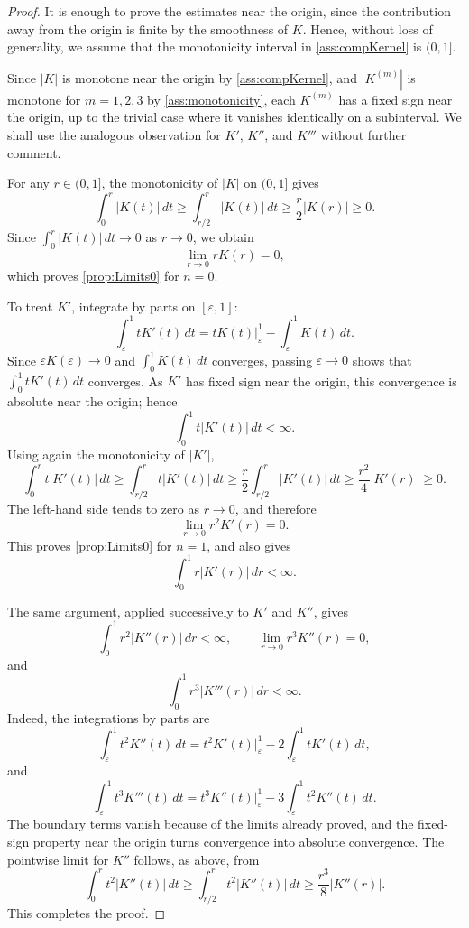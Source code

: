 \documentclass[a4paper]{amsart}
\theoremstyle{definition}
\begin{document}
\begin{proof}
It is enough to prove the estimates near the origin, since the contribution away from
the origin is finite by the smoothness of \(K\). Hence, without loss of generality, we
assume that the monotonicity interval in \ref{ass:compKernel} is \((0,1]\).

Since \(|K|\) is monotone near the origin by \ref{ass:compKernel}, and
\(|K^{(m)}|\) is monotone for \(m=1,2,3\) by \ref{ass:monotonicity}, each \(K^{(m)}\)
has a fixed sign near the origin, up to the trivial case where it vanishes identically
on a subinterval. We shall use the analogous
observation for \(K'\), \(K''\), and \(K'''\) without further comment.

For any \(r\in(0,1]\), the monotonicity of \(|K|\) on \((0,1]\) gives
\[
    \int_0^r |K(t)|\,dt
    \ge
    \int_{r/2}^r |K(t)|\,dt
    \ge
    \frac r2 |K(r)|
    \ge 0 .
\]
Since \(\int_0^r |K(t)|\,dt\to0\) as \(r\to0\), we obtain
\[
    \lim_{r\to0} rK(r)=0,
\]
which proves \ref{prop:Limits0} for \(n=0\).

To treat \(K'\), integrate by parts on \([\varepsilon,1]\):
\[
    \int_\varepsilon^1 tK'(t)\,dt
    =
    tK(t)\Big|_\varepsilon^1
    -
    \int_\varepsilon^1 K(t)\,dt .
\]
Since \(\varepsilon K(\varepsilon)\to0\) and \(\int_0^1 K(t)\,dt\) converges, passing
\(\varepsilon\to0\) shows that \(\int_0^1 tK'(t)\,dt\) converges. As \(K'\) has fixed
sign near the origin, this convergence is absolute near the origin; hence
\[
    \int_0^1 t|K'(t)|\,dt<\infty.
\]
Using again the monotonicity of \(|K'|\),
\[
    \int_0^r t|K'(t)|\,dt
    \ge
    \int_{r/2}^r t|K'(t)|\,dt
    \ge
    \frac r2\int_{r/2}^r |K'(t)|\,dt
    \ge
    \frac{r^2}{4}|K'(r)|
    \ge 0 .
\]
The left-hand side tends to zero as \(r\to0\), and therefore
\[
    \lim_{r\to0} r^2K'(r)=0.
\]
This proves \ref{prop:Limits0} for \(n=1\), and also gives
\[
    \int_0^1 r|K'(r)|\,dr<\infty.
\]

The same argument, applied successively to \(K'\) and \(K''\), gives
\[
    \int_0^1 r^2|K''(r)|\,dr<\infty,
    \qquad
    \lim_{r\to0} r^3K''(r)=0,
\]
and
\[
    \int_0^1 r^3|K'''(r)|\,dr<\infty.
\]
Indeed, the integrations by parts are
\[
    \int_\varepsilon^1 t^2K''(t)\,dt
    =
    t^2K'(t)\Big|_\varepsilon^1
    -
    2\int_\varepsilon^1 tK'(t)\,dt,
\]
and
\[
    \int_\varepsilon^1 t^3K'''(t)\,dt
    =
    t^3K''(t)\Big|_\varepsilon^1
    -
    3\int_\varepsilon^1 t^2K''(t)\,dt.
\]
The boundary terms vanish because of the limits already proved, and the fixed-sign
property near the origin turns convergence into absolute convergence. The pointwise
limit for \(K''\) follows, as above, from
\[
    \int_0^r t^2|K''(t)|\,dt
    \ge
    \int_{r/2}^r t^2|K''(t)|\,dt
    \ge
    \frac{r^3}{8}|K''(r)|.
\]
This completes the proof.
\end{proof}
\end{document}
